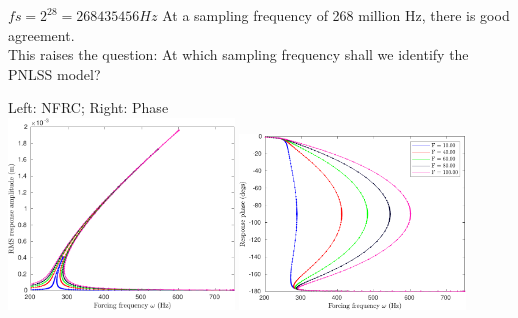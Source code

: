 \documentclass[9pt]{beamer}
\begin{document}
\begin{frame}{$fs=2^{28}=268435456 Hz$}
  At a sampling frequency of 268 million Hz, there is good agreement.\\
  This raises the question: At which sampling frequency shall we identify the
  PNLSS model?
 \begin{center}
    Left: NFRC; Right: Phase\\
    \includegraphics[width=0.45\textwidth]{fig/nfrc/dssex_frf_Amp_fs268435456}
    \includegraphics[width=0.45\textwidth]{fig/nfrc/dssex_frf_Phase_fs268435456}
  \end{center}
\end{frame}




\end{document}
